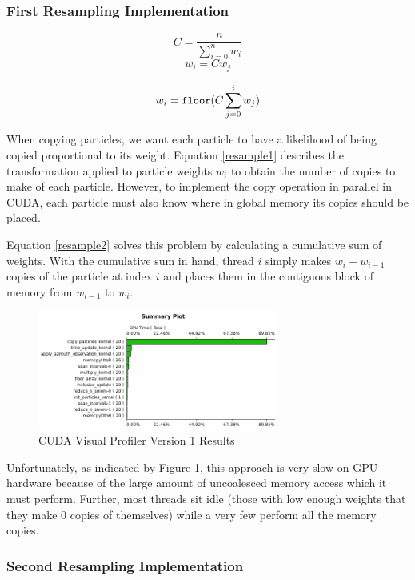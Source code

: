 \documentclass{article}
\begin{document}
\subsubsection{First Resampling Implementation}

\[ C = \frac{n}{\sum_{i=0}^{n} w_{i}} \]
\begin{equation}\label{resample1}
w_{i}=C w_{j}
\end{equation}

\begin{equation}\label{resample2}
w_{i}=\verb!floor!(C\sum_{j=0}^{i} w_{j})
\end{equation}

When copying particles, we want each particle to have a likelihood of being copied proportional to its weight. Equation \ref{resample1} describes the transformation applied to particle weights \(w_{i}\) to obtain the number of copies to make of each particle. However, to implement the copy operation in parallel in CUDA, each particle must also know where in global memory its copies should be placed.

Equation \ref{resample2} solves this problem by calculating a cumulative sum of weights. With the cumulative sum in hand, thread \(i\) simply makes \(w_{i}-w_{i-1}\) copies of the particle at index \(i\) and places them in the contiguous block of memory from \(w_{i-1}\) to \(w_{i}\).

\begin{figure}
\centering
\includegraphics[width=0.7\textwidth]{data/profile_cuda_version1_pic1.png}
\caption{CUDA Visual Profiler Version 1 Results}
\label{profiler1}
\end{figure}

Unfortunately, as indicated by Figure \ref{profiler1}, this approach is very slow on GPU hardware because of the large amount of uncoalesced memory access which it must perform. Further, most threads sit idle (those with low enough weights that they make 0 copies of themselves) while a very few perform all the memory copies.

\subsubsection{Second Resampling Implementation}\label{resamplesection2}
\end{document}
